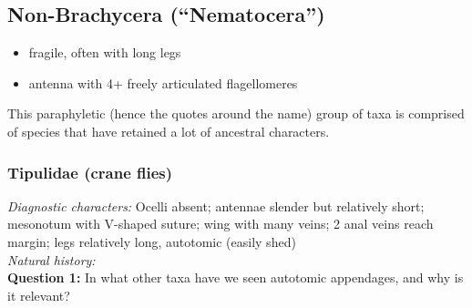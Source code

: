 \documentclass[letterpaper, 11pt]{article}
\begin{document}
\subsection{Non-Brachycera (``Nematocera'')}
\begin{itemize}
\item fragile, often with long legs 
\item antenna with 4+ freely articulated flagellomeres
\end{itemize}
This paraphyletic (hence the quotes around the name) group of taxa is comprised of species that have retained a lot of ancestral characters. 

\subsubsection{Tipulidae (crane flies)}
\noindent{}\textit{Diagnostic characters:} Ocelli absent; antennae slender but relatively short; mesonotum with V-shaped suture; wing with many veins; 2 anal veins reach margin; legs relatively long, autotomic (easily shed)\\

\noindent{}\textit{Natural history:} \\

\noindent\textbf{Question 1:} In what other taxa have we seen autotomic appendages, and why is it relevant?\\
\end{document}
